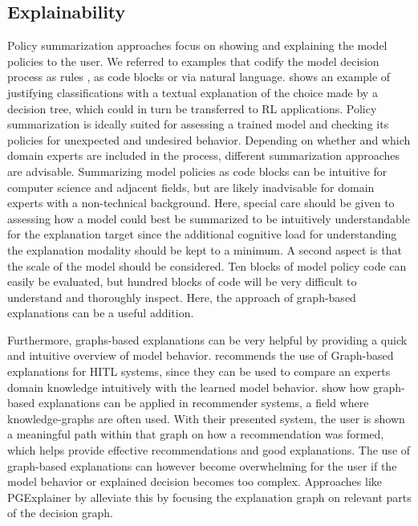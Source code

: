 \documentclass[twoside,11pt]{article}
\begin{document}
\begin{enumerate}
\subsection{Explainability}
Policy summarization approaches focus on showing and explaining the model policies to the user. We referred to examples that codify the model decision process as rules \citep{LiuEtAl:2018:LinearModelUTrees}, as code blocks \citep{VermaEtAl:2018:ProgrammaticallyInterpretableRL} or via natural language. \citet{AlonsoEtAl:2018:xAINLBeerClassifier} shows an example of justifying classifications with a textual explanation of the choice made by a decision tree, which could in turn be transferred to RL applications.
Policy summarization is ideally suited for assessing a trained model and checking its policies for unexpected and undesired behavior. Depending on whether and which domain experts are included in the process, different summarization approaches are advisable. Summarizing model policies as code blocks can be intuitive for computer science and adjacent fields, but are likely inadvisable for domain experts with a non-technical background. Here, special care should be given to assessing how a model could best be summarized to be intuitively understandable for the explanation target since the additional cognitive load for understanding the explanation modality should be kept to a minimum.
A second aspect is that the scale of the model should be considered. Ten blocks of model policy code can easily be evaluated, but hundred blocks of code will be very difficult to understand and thoroughly inspect. Here, the approach of graph-based explanations can be a useful addition.

Furthermore, graphs-based explanations can be very helpful by providing a quick and intuitive overview of model behavior. \citet{Holzinger:2016:iML} recommends the use of Graph-based explanations for HITL systems, since they can be used to compare an experts domain knowledge intuitively with the learned model behavior. \citet{SongEtAl:2019:ExplainableGraphBasedRecommendations} show how graph-based explanations can be applied in recommender systems, a field where knowledge-graphs are often used. With their presented system, the user is shown a meaningful path within that graph on how a recommendation was formed, which helps provide effective recommendations and good explanations.
The use of graph-based explanations can however become overwhelming for the user if the model behavior or explained decision becomes too complex. Approaches like PGExplainer by \citep{Vu:2020:PGMExplainer} alleviate this by focusing the explanation graph on relevant parts of the decision graph.


\end{enumerate}
\end{document}
